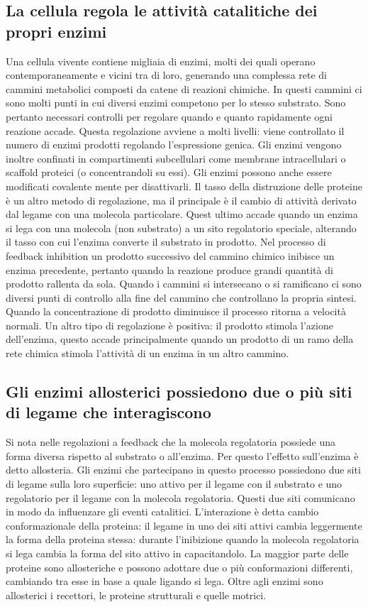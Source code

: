 \subsection{La cellula regola le attivit\`a catalitiche dei propri enzimi}
Una cellula vivente contiene migliaia di enzimi, molti dei quali operano contemporaneamente e vicini tra di loro, generando una complessa rete di cammini metabolici composti da catene
di reazioni chimiche. In questi cammini ci sono molti punti in cui diversi enzimi competono per lo stesso substrato. Sono pertanto necessari controlli per regolare quando e quanto 
rapidamente ogni reazione accade. Questa regolazione avviene a molti livelli: viene controllato il numero di enzimi prodotti regolando l'espressione genica. Gli enzimi vengono inoltre
confinati in compartimenti subcellulari come membrane intracellulari o scaffold proteici (o concentrandoli su essi). Gli enzimi possono anche essere modificati covalente mente per 
disattivarli. Il tasso della distruzione delle proteine \`e un altro metodo di regolazione, ma il principale \`e il cambio di attivit\`a derivato dal legame con una molecola particolare.
Quest ultimo accade quando un enzima si lega con una molecola (non substrato) a un sito regolatorio speciale, alterando il tasso con cui l'enzima converte il substrato in prodotto. Nel
processo di feedback inhibition un prodotto successivo del cammino chimico inibisce un enzima precedente, pertanto quando la reazione produce grandi quantit\`a di prodotto rallenta da 
sola. Quando i cammini si intersecano o si ramificano ci sono diversi punti di controllo alla fine del cammino che controllano la propria sintesi. Quando la concentrazione di prodotto
diminuisce il processo ritorna a velocit\`a normali. Un altro tipo di regolazione \`e positiva: il prodotto stimola l'azione dell'enzima, questo accade principalmente quando un prodotto
di un ramo della rete chimica stimola l'attivit\`a di un enzima in un altro cammino. 
\subsection{Gli enzimi allosterici possiedono due o pi\`u siti di legame che interagiscono}
Si nota nelle regolazioni a feedback che la molecola regolatoria possiede una forma diversa rispetto al substrato o all'enzima. Per questo l'effetto sull'enzima \`e detto allosteria. 
Gli enzimi che partecipano in questo processo possiedono due siti di legame sulla loro superficie: uno attivo per il legame con il substrato e uno regolatorio per il legame con la
molecola regolatoria. Questi due siti comunicano in modo da influenzare gli eventi catalitici. L'interazione \`e detta cambio conformazionale della proteina: il legame in uno dei siti
attivi cambia leggermente la forma della proteina stessa: durante l'inibizione quando la molecola regolatoria si lega cambia la forma del sito attivo in capacitandolo. La maggior parte
delle proteine sono allosteriche e possono adottare due o pi\`u conformazioni differenti, cambiando tra esse in base a quale ligando si lega. Oltre agli enzimi sono allosterici i 
recettori, le proteine strutturali e quelle motrici. 
